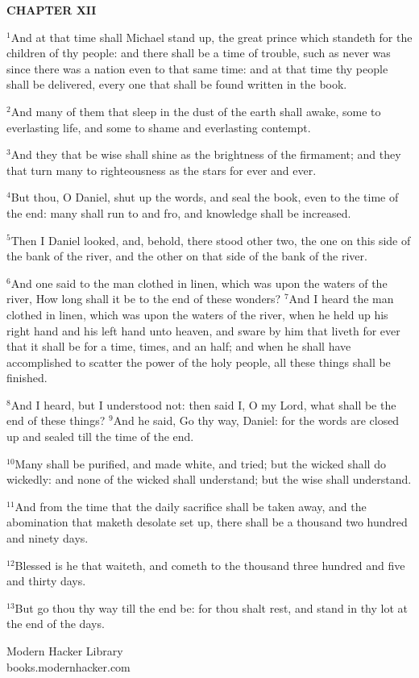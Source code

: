 \documentclass[12pt]{article}
\begin{document}
\begin{center}
\textbf{\small CHAPTER XII}
\end{center}
$^{1}$And at that time shall Michael stand up, the great prince which
standeth for the children of thy people: and there shall be a time of
trouble, such as never was since there was a nation even to that same
time: and at that time thy people shall be delivered, every one that
shall be found written in the book.


$^{2}$And many of them that sleep in the dust of the earth shall awake,
some to everlasting life, and some to shame and everlasting contempt.


$^{3}$And they that be wise shall shine as the brightness of the
firmament; and they that turn many to righteousness as the stars for
ever and ever.


$^{4}$But thou, O Daniel, shut up the words, and seal the book, even to
the time of the end: many shall run to and fro, and knowledge shall be
increased.


$^{5}$Then I Daniel looked, and, behold, there stood other two, the one
on this side of the bank of the river, and the other on that side of
the bank of the river.


$^{6}$And one said to the man clothed in linen, which was upon the
waters of the river, How long shall it be to the end of these wonders?
$^{7}$And I heard the man clothed in linen, which was upon the waters
of the river, when he held up his right hand and his left hand unto
heaven, and sware by him that liveth for ever that it shall be for a
time, times, and an half; and when he shall have accomplished to
scatter the power of the holy people, all these things shall be
finished.


$^{8}$And I heard, but I understood not: then said I, O my Lord, what
shall be the end of these things?  $^{9}$And he said, Go thy way,
Daniel: for the words are closed up and sealed till the time of the
end.


$^{10}$Many shall be purified, and made white, and tried; but the
wicked shall do wickedly: and none of the wicked shall understand; but
the wise shall understand.


$^{11}$And from the time that the daily sacrifice shall be taken away,
and the abomination that maketh desolate set up, there shall be a
thousand two hundred and ninety days.


$^{12}$Blessed is he that waiteth, and cometh to the thousand three
hundred and five and thirty days.


$^{13}$But go thou thy way till the end be: for thou shalt rest,
and stand in thy lot at the end of the days.






\vfill
\begin{center}
{\selectfont 
Modern Hacker Library\\books.modernhacker.com}
\end{center}
\end{document}
